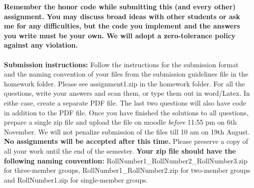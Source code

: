 \documentclass[11pt]{article}
\begin{document}
\maketitle

\textbf{Remember the honor code while submitting this (and every other) assignment. You may discuss broad ideas with other students or ask me for any difficulties, but the code you implement and the answers you write must be your own. We will adopt a \textbf{zero-tolerance policy} against any violation.}
\\
\\
\textbf{Submission instructions:} Follow the instructions for the submission format and the naming convention of your files from the submission guidelines file in the homework folder. Please see \textsf{assignment1.zip} in the homework folder. For all the questions, write your answers and scan them, or type them out in word/Latex. In eithe case, create a separate PDF file. The last two questions will also have code in addition to the PDF file. Once you have finished the solutions to all questions, prepare a single zip file and upload the file on moodle \emph{before} 11:55 pm on 6th November.  We will not penalize submission of the files till 10 am on 19th August. \textbf{No assignments will be accepted after this time.} Please preserve a copy of all your work until the end of the semester.  \textbf{Your zip file should have the following naming convention:} RollNumber1\_RollNumber2\_RollNumber3.zip for three-member groups, RollNumber1\_RollNumber2.zip for two-member groups and RollNumber1.zip for single-member groups. 
\end{document}
